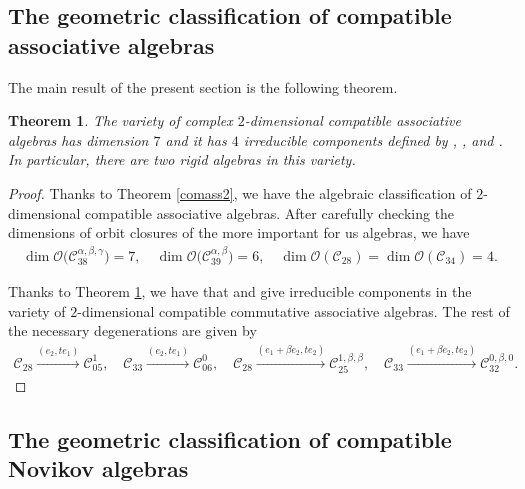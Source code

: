 \documentclass[10pt,a4paper]{amsart}
\numberwithin{equation}{section}
\newtheorem{Theorem}{Theorem}[section]
\begin{document}
\subsection{The geometric classification of compatible associative algebras}
The main result of the present section is the following theorem.

\begin{Theorem}\label{geo3}
The variety of complex $2$-dimensional compatible associative algebras has
dimension $7$ and it has $4$ irreducible components defined by
,
,
 and
.
In particular, there are two rigid algebras in this variety.

\end{Theorem}

\begin{proof}
 Thanks to Theorem \ref{comass2}, we have the algebraic classification of
 $2$-dimensional compatible associative algebras.
After carefully checking the dimensions of orbit closures of the more important for us algebras, we have
\begin{gather*}
\dim \mathcal{O}\bigl(\mathcal{C}_{38}^{\alpha,\beta,\gamma}\bigr)=7, \quad
\dim \mathcal{O}\bigl(\mathcal{C}_{39}^{\alpha,\beta}\bigr)=6, \quad
\dim \mathcal{O}(\mathcal{C}_{28})=\dim \mathcal{O}(\mathcal{C}_{34})=4.
\end{gather*}

Thanks to Theorem \ref{geo3}, we have that
 and  give irreducible components in the variety of $2$-dimensional compatible commutative associative algebras.
The rest of the necessary degenerations are given by
\begin{gather*}
 \mathcal{C}_{28} \xrightarrow{ ( e_2, te_1)} \mathcal{C}_{05}^1, \quad
 \mathcal{C}_{33} \xrightarrow{ ( e_2, te_1)} \mathcal{C}_{06}^0, \quad
 \mathcal{C}_{28} \xrightarrow{ (e_1+\beta e_2, te_2)} \mathcal{C}_{25}^{1,\beta,\beta}, \quad
 \mathcal{C}_{33} \xrightarrow{ ( e_1+\beta e_2, te_2)} \mathcal{C}_{32}^{0,\beta,0}.\tag*{\qed} \end{gather*}\renewcommand{\qed}{}
\end{proof}

\subsection{The geometric classification of compatible Novikov algebras}
\end{document}

